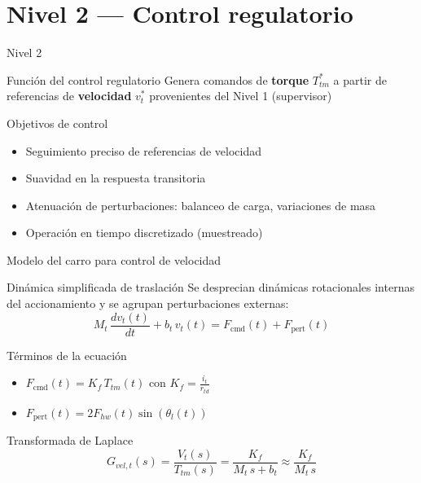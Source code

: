 \section{Nivel 2 --- Control regulatorio}
\begin{frame}{Nivel 2}
  \begin{block}{Función del control regulatorio}
    Genera comandos de \textbf{torque} $T_{tm}^*$ a partir de referencias de \textbf{velocidad} $v_t^*$ provenientes del Nivel 1 (supervisor)
  \end{block}

  \begin{block}{Objetivos de control}
    \begin{itemize}
      \item Seguimiento preciso de referencias de velocidad
      \item Suavidad en la respuesta transitoria
      \item Atenuación de perturbaciones: balanceo de carga, variaciones de masa
      \item Operación en tiempo discretizado (muestreado)
    \end{itemize}
  \end{block}

\end{frame}

\begin{frame}{Modelo del carro para control de velocidad}
  \begin{block}{Dinámica simplificada de traslación}
    Se desprecian dinámicas rotacionales internas del accionamiento y se agrupan perturbaciones externas:
    \[
    M_t\,\frac{dv_t(t)}{dt} + b_t\,v_t(t) = F_{\text{cmd}}(t) + F_{\text{pert}}(t)
    \]
  \end{block}

  \vspace{-0.2cm}
  \begin{block}{Términos de la ecuación}
    \begin{itemize}
      \item $F_{\text{cmd}}(t) = K_f \, T_{tm}(t)$ con $K_f = \frac{i_t}{r_{td}}$
      \vspace{0.05cm}
      \item $F_{\text{pert}}(t) = 2F_{hw}(t)\sin(\theta_l(t))$ 
    \end{itemize}
  \end{block}

  \begin{alertblock}{Transformada de Laplace}
    \[
    G_{vel,t}(s) = \frac{V_t(s)}{T_{tm}(s)} = \frac{K_f}{M_t\,s + b_t} \approx \frac{K_f}{M_t\,s}
    \]
  \end{alertblock}
\end{frame}

